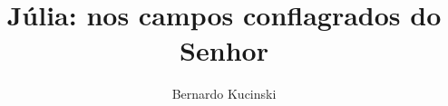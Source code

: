 \documentclass[12pt]{extarticle}
\begin{document}
\newcommand{\AutorLivro}{Bernardo Kucinski}
\newcommand{\TituloLivro}{Júlia: nos campos conflagrados do Senhor}
\newcommand{\Tema}{Ficção, mistério e fantasia}
\newcommand{\Genero}{Romance}
\newcommand{\imagemCapa}{./images/PNLD0053-01.png}
\newcommand{\issnppub}{978-65-5966-013-1}
\newcommand{\issnepub}{978-65-5966-014-8}
\newcommand{\colaborador}{{Haroldo Ceravolo}}


\title{\TituloLivro}
\author{\AutorLivro}
\def\authornotes{\colaborador}

\date{}
\maketitle
\end{document}
